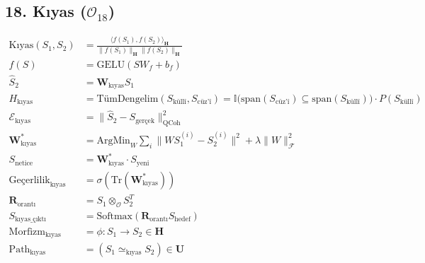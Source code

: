 \documentclass[11pt, a4paper]{article}
\begin{document}
\subsection{18. Kıyas ($\mathcal{O}_{18}$)}
\begin{align}
\text{Kıyas}(S_1, S_2) &= \frac{\langle f(S_1), f(S_2) \rangle_{\mathbf{H}}}{\|f(S_1)\|_{\mathbf{H}} \|f(S_2)\|_{\mathbf{H}}} \\
f(S) &= \text{GELU}(S W_f + b_f) \\
\hat{S}_2 &= \mathbf{W}_{\text{kıyas}} S_1 \\
H_{\text{kıyas}} &= \text{TümDengelim}(S_{\text{küllî}}, S_{\text{cüz'î}}) = \mathbb{I}\big(\text{span}(S_{\text{cüz'î}}) \subseteq \text{span}(S_{\text{küllî}})\big) \cdot P(S_{\text{küllî}}) \\
\mathcal{E}_{\text{kıyas}} &= \| \hat{S}_2 - S_{\text{gerçek}} \|_{\text{QCoh}}^2 \\
\mathbf{W}_{\text{kıyas}}^* &= \text{ArgMin}_W \sum_i \| W S_1^{(i)} - S_2^{(i)} \|^2 + \lambda \|W\|_{\mathcal{F}}^2 \\
S_{\text{netice}} &= \mathbf{W}_{\text{kıyas}}^* \cdot S_{\text{yeni}} \\
\text{Geçerlilik}_{\text{kıyas}} &= \sigma(\text{Tr}(\mathbf{W}_{\text{kıyas}}^*)) \\
\mathbf{R}_{\text{orantı}} &= S_1 \otimes_{\mathcal{O}} S_2^T \\
S_{\text{kıyas\_çıktı}} &= \text{Softmax}(\mathbf{R}_{\text{orantı}} S_{\text{hedef}}) \\
\text{Morfizm}_{\text{kıyas}} &= \phi : S_1 \to S_2 \in \mathbf{H} \\
\text{Path}_{\text{kıyas}} &= (S_1 \simeq_{\text{kıyas}} S_2) \in \mathbf{U}
\end{align}
\end{document}

